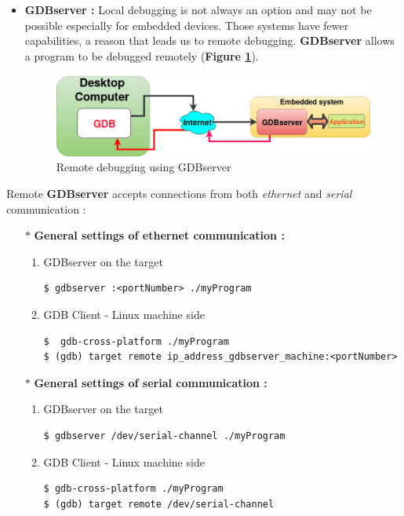 \begin{itemize}
\begin{itemize}
\end{itemize}	
	
	\item \textbf{GDBserver : }
	Local debugging is not always an option and may not be possible especially for embedded devices. Those systems
have fewer capabilities, a reason that leads us to remote debugging. \textbf{GDBserver} allows a program to be debugged remotely (\textbf{Figure \ref{Remote debugging using GDBserver}}).

\begin{figure}[H]
		\centering
        \includegraphics[scale=0.40]{img/solution/gdbAndGDBserver.png}
        \caption{Remote debugging using GDBserver}
        \label{Remote debugging using GDBserver}
    \end{figure}
\end{itemize}


Remote \textbf{GDBserver} accepts connections from both \emph{ethernet} and \emph{serial} communication : 
\begin{itemize}
	\item[$\ast$] \textbf{General settings of ethernet communication : } 
		\begin{enumerate}
			\item {GDBserver on the target}
						\begin{lstlisting}[style=BashInputStyle]
$ gdbserver :<portNumber> ./myProgram
						\end{lstlisting}
			\item {GDB Client - Linux machine side}
						\begin{lstlisting}[style=BashInputStyle]
$  gdb-cross-platform ./myProgram
$ (gdb) target remote ip_address_gdbserver_machine:<portNumber>
						\end{lstlisting}
						
		\end{enumerate}				
		
		
	\item[$\ast$] \textbf{General settings of serial communication : }	
		\begin{enumerate}
			\item {GDBserver on the target}
						\begin{lstlisting}[style=BashInputStyle]
$ gdbserver /dev/serial-channel ./myProgram
						\end{lstlisting}			
			\item {GDB Client - Linux machine side}
						\begin{lstlisting}[style=BashInputStyle]
$ gdb-cross-platform ./myProgram
$ (gdb) target remote /dev/serial-channel
						\end{lstlisting}	
		\end{enumerate}
\end{itemize}

